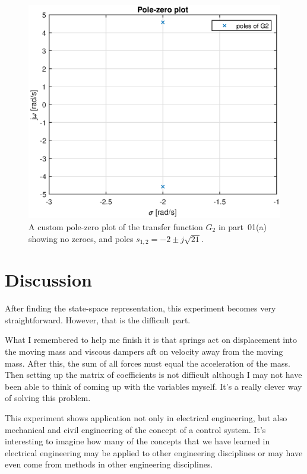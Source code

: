 \documentclass[12pt]{article}
\begin{document}
\begin{figure}
    \centering
    \includegraphics[width=\linewidth]{img/part01a_pzplot.eps}
    \caption{A custom pole-zero plot of the transfer function $G_2$ in part~01(a) showing no zeroes, and poles $s_{1,2} = -2 \pm j\sqrt{21}$.}
    \label{fig:pzplot_1a}
\end{figure}



\section{Discussion}

After finding the state-space representation,
this experiment becomes very straightforward.
However, that is the difficult part.

What I remembered to help me finish it is that springs act on displacement into the moving mass and viscous dampers aft on velocity away from the moving mass.
After this, the sum of all forces must equal the acceleration of the mass.
Then setting up the matrix of coefficients is not difficult although I may not have been able to think of coming up with the variables myself.
It's a really clever way of solving this problem.

This experiment shows application not only in electrical engineering, but also mechanical and civil engineering of the concept of a control system.
It's interesting to imagine how many of the concepts that we have learned in electrical engineering may be applied to other engineering disciplines or may have even come from methods in other engineering disciplines.
\end{document}
